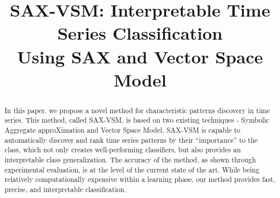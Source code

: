 \documentclass[conference]{IEEEtran}
\begin{document}
%
\title{SAX-VSM: Interpretable Time Series Classification\\ Using SAX and Vector Space Model}

 \author{
 \and
 }
\maketitle

\begin{abstract}
In this paper, we propose a novel method for characteristic patterns discovery in 
time series. This method, called SAX-VSM, is based on two existing techniques - 
Symbolic Aggregate approXimation and Vector Space Model. SAX-VSM is capable 
to automatically discover and rank time series patterns by their 
“importance” to the class, which not only creates well-performing classifiers,
but also provides an interpretable class generalization. 
The accuracy of the method, as shown through experimental evaluation, is at the 
level of the current state of the art. 
While being relatively computationally expensive within a learning phase, 
our method provides fast, precise, and interpretable classification.
\end{abstract}


%
\end{document}
